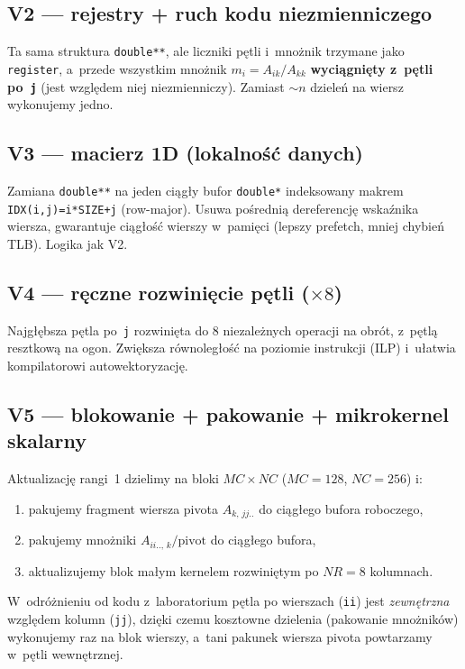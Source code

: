 \documentclass[11pt,a4paper]{article}
\begin{document}
\subsection{V2 --- rejestry + ruch kodu niezmienniczego}
Ta sama struktura \texttt{double**}, ale liczniki pętli i~mnożnik trzymane jako \texttt{register},
a~przede wszystkim mnożnik $m_i = A_{ik}/A_{kk}$ \textbf{wyciągnięty z~pętli po~\texttt{j}}
(jest względem niej niezmienniczy). Zamiast $\sim n$ dzieleń na wiersz wykonujemy jedno.

\subsection{V3 --- macierz 1D (lokalność danych)}
Zamiana \texttt{double**} na jeden ciągły bufor \texttt{double*} indeksowany makrem
\texttt{IDX(i,j)=i*SIZE+j} (row-major). Usuwa pośrednią dereferencję wskaźnika wiersza,
gwarantuje ciągłość wierszy w~pamięci (lepszy prefetch, mniej chybień TLB). Logika jak V2.

\subsection{V4 --- ręczne rozwinięcie pętli ($\times 8$)}
Najgłębsza pętla po~\texttt{j} rozwinięta do 8 niezależnych operacji na obrót, z~pętlą
resztkową na ogon. Zwiększa równoległość na poziomie instrukcji (ILP) i~ułatwia
kompilatorowi autowektoryzację.

\subsection{V5 --- blokowanie + pakowanie + mikrokernel skalarny}
Aktualizację rangi~1 dzielimy na bloki $MC\times NC$ ($MC=128$, $NC=256$) i:
\begin{enumerate}\itemsep0pt
  \item pakujemy fragment wiersza pivota $A_{k,\,jj..}$ do ciągłego bufora roboczego,
  \item pakujemy mnożniki $A_{ii..,\,k}/\text{pivot}$ do ciągłego bufora,
  \item aktualizujemy blok małym kernelem rozwiniętym po $NR=8$ kolumnach.
\end{enumerate}
W~odróżnieniu od kodu z~laboratorium pętla po wierszach (\texttt{ii}) jest \emph{zewnętrzna}
względem kolumn (\texttt{jj}), dzięki czemu kosztowne dzielenia (pakowanie mnożników)
wykonujemy raz na blok wierszy, a~tani pakunek wiersza pivota powtarzamy w~pętli wewnętrznej.
\end{document}
